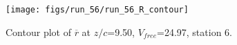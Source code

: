 \begin{figure}[H]
\centering
\texttt{[image: figs/run\_56/run\_56\_R\_contour]}
\caption{Contour plot of $\overline{r}$ at $z/c$=9.50, $V_{free}$=24.97, station 6.}
\label{fig:run_56_R_contour}
\end{figure}


